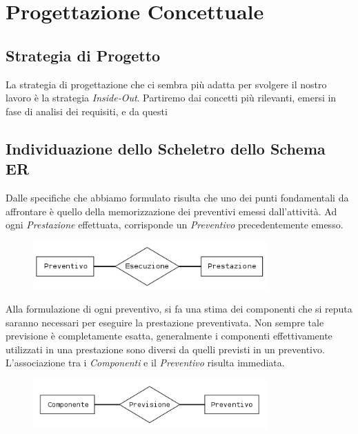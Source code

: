 \section{Progettazione Concettuale}
	
	\subsection{Strategia di Progetto}
		
		La strategia di progettazione che ci sembra più adatta per svolgere il nostro lavoro è la strategia \emph{Inside-Out}. Partiremo dai concetti più rilevanti, emersi in fase di analisi dei requisiti, e da questi 
						
		{\color{red}{Questa sezione va ampliata e corretta}}
		
	\subsection{Individuazione dello Scheletro dello Schema ER}
		
		Dalle specifiche che abbiamo formulato risulta che uno dei punti fondamentali da affrontare è quello della memorizzazione dei preventivi emessi dall'attività.
		Ad ogni \emph{Prestazione} effettuata, corrisponde un \emph{Preventivo} precedentemente emesso.
		
		\begin{figure}[H]
			\centering
			\includegraphics[width=9cm]{images/diagrams/preventivo_prestazione.png}
		\end{figure}
		
		Alla formulazione di ogni preventivo, si fa una stima dei componenti che si reputa saranno necessari per eseguire la prestazione preventivata. Non sempre tale previsione è completamente esatta, generalmente i componenti effettivamente utilizzati in una prestazione sono diversi da quelli previsti in un preventivo.
		L'associazione tra i \emph{Componenti} e il \emph{Preventivo} risulta immediata.
		
		\begin{figure}[H]
			\centering
			\includegraphics[width=9cm]{images/diagrams/preventivo_componente.png}
		\end{figure}
		
